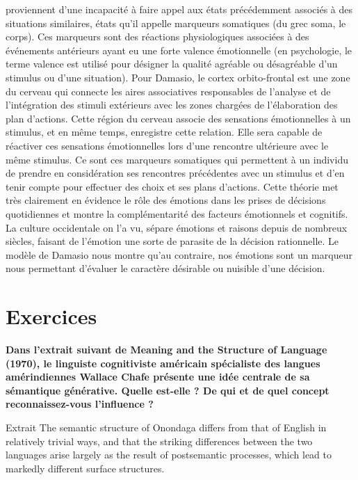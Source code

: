 
proviennent d’une incapacité à faire appel aux états précédemment associés à des situations similaires, états qu’il appelle marqueurs somatiques (du grec soma, le corps). Ces marqueurs sont des réactions physiologiques associées à des événements antérieurs ayant eu une forte valence émotionnelle (en psychologie, le terme valence est utilisé pour désigner la qualité agréable ou désagréable d’un stimulus ou d’une situation). Pour Damasio, le cortex orbito-frontal est une zone du cerveau qui connecte les aires associatives responsables de l'analyse et de l'intégration des stimuli extérieurs avec les zones chargées de l'élaboration des plan d’actions. Cette région du cerveau associe des sensations émotionnelles à un stimulus, et en même temps, enregistre cette relation. Elle sera capable de réactiver ces sensations émotionnelles lors d’une rencontre ultérieure avec le même stimulus. Ce sont ces marqueurs somatiques qui permettent à un individu de prendre en considération ses rencontres précédentes avec un stimulus et d’en tenir compte pour effectuer des choix et ses plans d’actions. Cette théorie met très clairement en évidence le rôle des émotions dans les prises de décisions quotidiennes et montre la complémentarité des facteurs émotionnels et cognitifs. La culture occidentale on l’a vu, sépare émotions et raisons depuis de nombreux siècles, faisant de l'émotion une sorte de parasite de la décision rationnelle. Le modèle de Damasio nous montre qu’au contraire, nos émotions sont un marqueur nous permettant d’évaluer le caractère désirable ou nuisible d’une décision.\par

\section*{Exercices}

\textbf{Dans l’extrait suivant de Meaning and the Structure of Language (1970), le linguiste cognitiviste américain spécialiste des langues amérindiennes Wallace Chafe présente une idée centrale de sa sémantique générative. Quelle est-elle ? De qui et de quel concept reconnaissez-vous l’influence ?}
\begin{lecture}{Extrait}
The semantic structure of Onondaga differs from that of English in relatively trivial ways, and that the striking differences between the two languages arise largely as the result of postsemantic processes, which lead to markedly different surface structures.\end{lecture}

